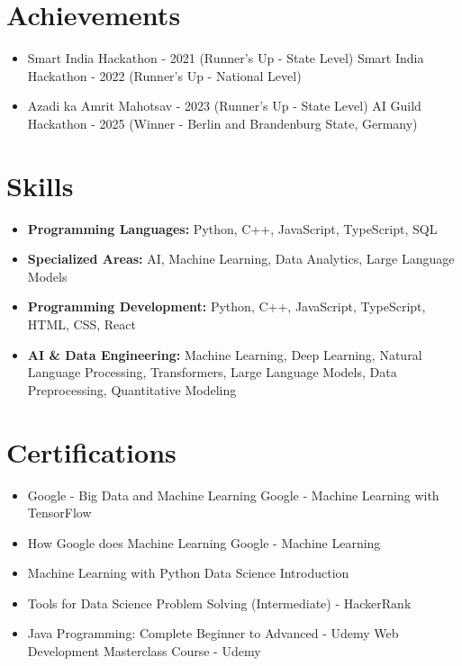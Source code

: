 \documentclass[a4paper,10pt]{article}
\begin{document}
\section*{Achievements}
\begin{itemize}
\item Smart India Hackathon - 2021 (Runner's Up - State Level) \hfill Smart India Hackathon - 2022 (Runner's Up - National Level)
\item Azadi ka Amrit Mahotsav - 2023 (Runner's Up - State Level) \hfill AI Guild Hackathon - 2025 (Winner - Berlin and Brandenburg State, Germany)
\end{itemize}

\section*{Skills}
\begin{itemize}
  \item \textbf{Programming Languages:} Python, C++, JavaScript, TypeScript, SQL
  \item \textbf{Specialized Areas:} AI, Machine Learning, Data Analytics, Large Language Models
  \item \textbf{Programming Development:} Python, C++, JavaScript, TypeScript, HTML, CSS, React
  \item \textbf{AI \& Data Engineering:} Machine Learning, Deep Learning, Natural Language Processing, Transformers, Large Language Models, Data Preprocessing, Quantitative Modeling
\end{itemize}

\section*{Certifications}
\begin{itemize}
\item Google - Big Data and Machine Learning \hfill Google - Machine Learning with TensorFlow
\item How Google does Machine Learning \hfill Google - Machine Learning
\item Machine Learning with Python \hfill Data Science Introduction
\item Tools for Data Science \hfill Problem Solving (Intermediate) - HackerRank
\item Java Programming: Complete Beginner to Advanced - Udemy \hfill Web Development Masterclass Course - Udemy
\end{itemize}
\end{document}
